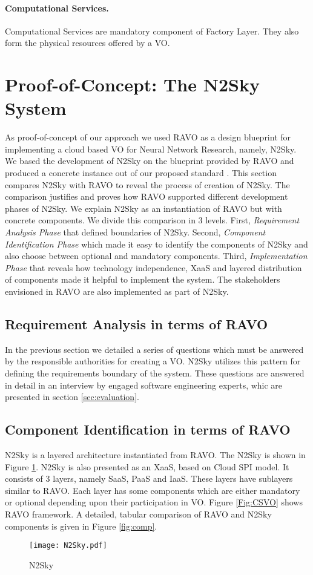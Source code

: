 \documentclass[]{article}
\begin{document}
\paragraph{Computational Services.}
Computational Services are mandatory component of Factory Layer. They also form the physical resources offered by a VO.


\section{Proof-of-Concept: The N2Sky System}\label{sec:n2sky}



As proof-of-concept of our approach we used RAVO as a design blueprint for implementing a cloud based VO for Neural Network Research, namely, N2Sky. We based the development of N2Sky on the blueprint provided by RAVO and  produced a concrete instance out of our proposed standard \cite{mann13}. This section compares N2Sky with RAVO to reveal the process of creation of N2Sky. The comparison justifies and proves how RAVO supported different development phases of N2Sky. We explain N2Sky as an instantiation of RAVO but with concrete components. We divide this comparison in 3 levels. First, \emph{Requirement Analysis Phase} that defined boundaries of N2Sky. Second, \emph{Component Identification Phase} which made it easy to identify the components of N2Sky and also choose between optional and mandatory components. Third, \emph{Implementation Phase} that reveals how technology independence, XaaS and layered distribution of components made it helpful to implement the system. The stakeholders envisioned in RAVO are also implemented as part of N2Sky.

\subsection{Requirement Analysis in terms of RAVO}
In the previous section we detailed a series of questions which must be answered by the responsible authorities for creating a VO. N2Sky utilizes this pattern for defining the requirements boundary of the system. These questions are answered in detail in an interview by engaged software engineering experts, whic are presented in section \ref{sec:evaluation}.
\subsection{ Component Identification in terms of RAVO}
N2Sky is a layered architecture instantiated from RAVO. The N2Sky is shown in Figure \ref{Fig:N2S}. N2Sky is also presented as an XaaS, based on Cloud SPI model. It consists of 3 layers, namely SaaS, PaaS and IaaS. These layers have sublayers similar to RAVO. Each layer has some components which are either mandatory or optional depending upon their participation in VO. Figure \ref{Fig:CSVO} shows RAVO framework. A detailed, tabular comparison of RAVO and N2Sky components is given in Figure \ref{fig:comp}.
\begin{figure}
\begin{center}
  \texttt{[image: N2Sky.pdf]}
  \caption{N2Sky}
  \label{Fig:N2S}
  \end{center}
   \end{figure}
\end{document}
